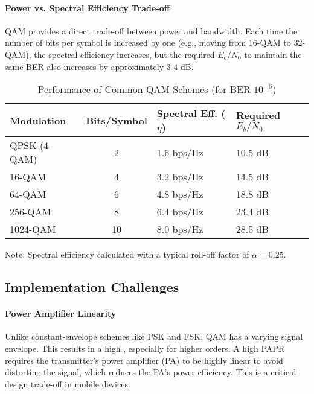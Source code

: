\paragraph{Power vs. Spectral Efficiency Trade-off}
QAM provides a direct trade-off between power and bandwidth. Each time the number of bits per symbol is increased by one (e.g., moving from 16-QAM to 32-QAM), the spectral efficiency increases, but the required $E_b/N_0$ to maintain the same BER also increases by approximately 3-4 dB.

\begin{table}[H]
    \centering
    \caption{Performance of Common QAM Schemes (for BER $10^{-6}$)}
    \label{tab:qam-performance}
    \begin{tabularx}{\textwidth}{@{}lcXX@{}}
        \toprule
        \tableheaderfont Modulation & \tableheaderfont Bits/Symbol & \tableheaderfont Spectral Eff. ($\eta$) & \tableheaderfont Required $E_b/N_0$ \\
        \midrule
        QPSK (4-QAM) & 2 & 1.6 bps/Hz & 10.5 dB \\
        16-QAM & 4 & 3.2 bps/Hz & 14.5 dB \\
        64-QAM & 6 & 4.8 bps/Hz & 18.8 dB \\
        256-QAM & 8 & 6.4 bps/Hz & 23.4 dB \\
        1024-QAM & 10 & 8.0 bps/Hz & 28.5 dB \\
        \bottomrule
    \end{tabularx}
    \par\vspace{0.5em}
    \small Note: Spectral efficiency calculated with a typical roll-off factor of $\alpha=0.25$.
\end{table}


\subsection{Implementation Challenges}

\paragraph{Power Amplifier Linearity}
Unlike constant-envelope schemes like PSK and FSK, QAM has a varying signal envelope. This results in a high , especially for higher orders. A high PAPR requires the transmitter's power amplifier (PA) to be highly linear to avoid distorting the signal, which reduces the PA's power efficiency. This is a critical design trade-off in mobile devices.

